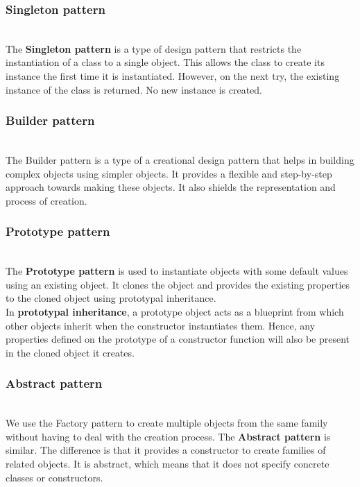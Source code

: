 \subsubsection{Singleton pattern}\label{singleton-pattern}
\\
The \textbf{Singleton pattern} is a type of design pattern that restricts the instantiation of a class to a single object. This allows the class to create its instance the first time it is instantiated. However, on the next try, the existing instance of the class is returned. No new instance is created.

\subsubsection{Builder pattern}\label{builder-pattern}
\\
The Builder pattern is a type of a creational design pattern that helps in building complex objects using simpler objects. It provides a flexible and step-by-step approach towards making these objects. It also shields the representation and process of creation.

\subsubsection{Prototype pattern}\label{prototype-pattern}
\\
The \textbf{Prototype pattern} is used to instantiate objects with some default values using an existing object. It clones the object and provides the existing properties to the cloned object using prototypal inheritance.
\\
In \textbf{prototypal inheritance}, a prototype object acts as a blueprint from which other objects inherit when the constructor instantiates them. Hence, any properties defined on the prototype of a constructor function will also be present in the cloned object it creates.

\subsubsection{Abstract pattern}\label{abstract-pattern}
\\
We use the Factory pattern to create multiple objects from the same family without having to deal with the creation process. The \textbf{Abstract pattern} is similar. The difference is that it provides a constructor to create families of related objects. It is abstract, which means that it does not specify concrete classes or constructors.

